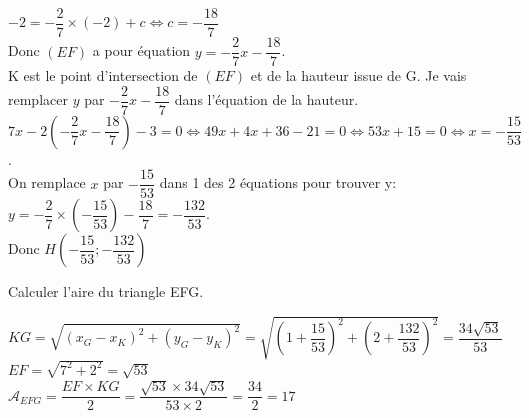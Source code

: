 \documentclass[11pt,a4paper]{article}  %
\begin{document}
\begin{enumMet}
\begin{corrBox}
		$-2=-\dfrac{2}{7}\times(-2)+c \iff c=-\dfrac{18}{7}$\\
		Donc $(EF)$ a pour équation $y=-\dfrac{2}{7}x-\dfrac{18}{7}$.\\
		K est le point d'intersection de $(EF)$ et de la hauteur issue de G. Je vais remplacer $y$ par $-\dfrac{2}{7}x-\dfrac{18}{7}$ dans l'équation de la hauteur.\\
		$7x-2\left(-\dfrac{2}{7}x-\dfrac{18}{7}\right)-3=0 \iff 49x+4x+36-21=0 \iff 53x+15=0 \iff x=-\dfrac{15}{53}$.\\
		On remplace $x$ par $-\dfrac{15}{53}$ dans 1 des 2 équations pour trouver y:\\
		$y=-\dfrac{2}{7}\times(-\dfrac{15}{53}) -\dfrac{18}{7}=-\dfrac{132}{53}$.\\
		Donc $H\left(-\dfrac{15}{53}; -\dfrac{132}{53}\right)$
	\end{corrBox}
	\item Calculer l'aire du triangle EFG.
	\begin{corrBox}
		$KG=\sqrt{(x_G-x_K)^2+(y_G-y_K)^2}=\sqrt{\left(1+\dfrac{15}{53}\right)^2+\left(2+\dfrac{132}{53}\right)^2}=\dfrac{34\sqrt{53}}{53}$\\
		$EF=\sqrt{7^2+2^2}=\sqrt{53}$\\
		$\mathrm{\mathscr{A}}_{EFG}=\dfrac{EF\times KG}{2}=\dfrac{\sqrt{53}\times 34\sqrt{53}}{53\times2}=\dfrac{34}{2}=17$
	\end{corrBox}
\end{enumMet}
\end{document}
